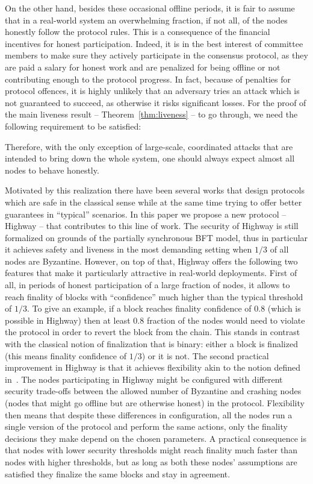 \documentclass[12pt, fleqn]{article}
\begin{document}
On the other hand, besides these occasional offline periods, it is fair to assume that in a real-world system an overwhelming fraction, if not all, of the nodes honestly follow the protocol rules.
%
This is a consequence of the financial incentives for honest participation.
%
Indeed, it is in the best interest of committee members to make sure they actively participate in the consensus protocol, as they are paid a salary for honest work and are penalized for being offline or not contributing enough to the protocol progress.
%
In fact, because of penalties for protocol offences, it is highly unlikely that an adversary tries an attack which is not guaranteed to succeed, as otherwise it risks significant losses.
For the proof of the main liveness result -- Theorem~\ref{thm:liveness} -- to go through, we need the following requirement to be satisfied: 

%
Therefore, with the only exception of large-scale, coordinated attacks that are intended to bring down the whole system, one should always expect almost all nodes to behave honestly.

Motivated by this realization there have been several works that design protocols which are safe in the classical sense while at the same time trying to offer better guarantees in ``typical'' scenarios.
%
In this paper we propose a new protocol -- Highway -- that contributes to this line of work.
%
The security of Highway is still formalized on grounds of the partially synchronous BFT model, thus in particular it achieves safety and liveness in the most demanding setting when $1/3$ of all nodes are Byzantine.
%
However, on top of that, Highway offers the following two features that make it particularly attractive in real-world deployments.
%
First of all, in periods of honest participation of a large fraction of nodes, it allows to reach finality of blocks with ``confidence'' much higher than the typical threshold of $1/3$.
To give an example, if a block reaches finality confidence of $0.8$ (which is possible in Highway) then at least $0.8$ fraction of the nodes would need to violate the protocol in order to revert the block from the chain.
%
This stands in contrast with the classical notion of finalization that is binary: either a block is finalized (this means finality confidence of $1/3$) or it is not.
%
The second practical improvement in Highway is that it achieves flexibility akin to the notion defined in~\cite{MNR19}.
%
The nodes participating in Highway might be configured with different security trade-offs between the allowed number of Byzantine and crashing nodes (nodes that might go offline but are otherwise honest) in the protocol.
%
Flexibility then means that despite these differences in configuration, all the nodes run a single version of the protocol and perform the same actions, only the finality decisions they make depend on the chosen parameters.
%
A practical consequence is that nodes with lower security thresholds might reach finality much faster than nodes with higher thresholds, but as long as both these nodes' assumptions are satisfied they finalize the same blocks and stay in agreement.
    
\end{document}

